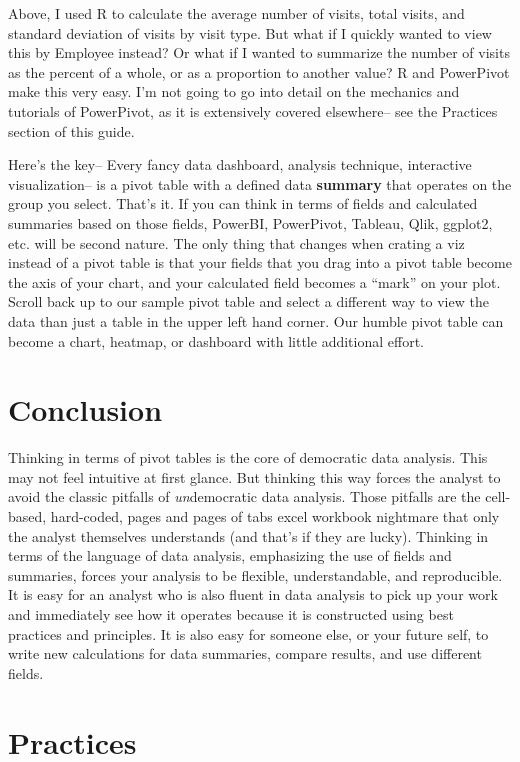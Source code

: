 \documentclass[]{book}
\begin{document}
Above, I used R to calculate the average number of visits, total visits, and standard deviation of visits by visit type. But what if I quickly wanted to view this by Employee instead? Or what if I wanted to summarize the number of visits as the percent of a whole, or as a proportion to another value? R and PowerPivot make this very easy. I'm not going to go into detail on the mechanics and tutorials of PowerPivot, as it is extensively covered elsewhere-- see the Practices section of this guide.

Here's the key-- Every fancy data dashboard, analysis technique, interactive visualization-- is a pivot table with a defined data \textbf{summary} that operates on the group you select. That's it. If you can think in terms of fields and calculated summaries based on those fields, PowerBI, PowerPivot, Tableau, Qlik, ggplot2, etc. will be second nature. The only thing that changes when crating a viz instead of a pivot table is that your fields that you drag into a pivot table become the axis of your chart, and your calculated field becomes a ``mark'' on your plot. Scroll back up to our sample pivot table and select a different way to view the data than just a table in the upper left hand corner. Our humble pivot table can become a chart, heatmap, or dashboard with little additional effort.

\hypertarget{conclusion-1}{%
\section{Conclusion}\label{conclusion-1}}

Thinking in terms of pivot tables is the core of democratic data analysis. This may not feel intuitive at first glance. But thinking this way forces the analyst to avoid the classic pitfalls of \emph{un}democratic data analysis. Those pitfalls are the cell-based, hard-coded, pages and pages of tabs excel workbook nightmare that only the analyst themselves understands (and that's if they are lucky). Thinking in terms of the language of data analysis, emphasizing the use of fields and summaries, forces your analysis to be flexible, understandable, and reproducible. It is easy for an analyst who is also fluent in data analysis to pick up your work and immediately see how it operates because it is constructed using best practices and principles. It is also easy for someone else, or your future self, to write new calculations for data summaries, compare results, and use different fields.

\hypertarget{practices}{%
\section{Practices}\label{practices}}
\end{document}
